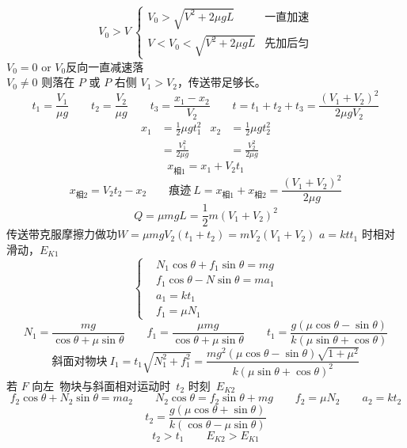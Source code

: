 \[
V_0>V\ \left\{\begin{array}{ll}
V_0>\sqrt{V^2+2\mu gL} & \text{一直加速}\\
V<V_0<\sqrt{V^2+2\mu gL} & \text{先加后匀}
\end{array}\right.
\]
$V_0=0$ or $V_0$反向\quad 一直减速落\\
$V_0\neq0$ 则\quad 落在 $P$ 或 $P$ 右侧
$V_1>V_2$，传送带足够长。
\[
t_1=\frac{V_1}{\mu g}\qquad t_2=\frac{V_2}{\mu g}\qquad t_3=\frac{x_1-x_2}{V_2}\qquad t=t_1+t_2+t_3=\frac{(V_1+V_2)^2}{2\mu gV_2}
\]
\[
\begin{aligned}
x_1&=\frac12\mu gt_1^2 & x_2&=\frac12\mu gt_2^2\\[2pt]
&=\frac{V_1^2}{2\mu g} & &=\frac{V_2^2}{2\mu g}
\end{aligned}
\]
\[
x_{\text{相}1}=x_1+V_2t_1
\]
\[
x_{\text{相}2}=V_2t_2-x_2\qquad \text{痕迹}\ L=x_{\text{相}1}+x_{\text{相}2}=\frac{(V_1+V_2)^2}{2\mu g}
\]
\[
Q=\mu mgL=\frac12m(V_1+V_2)^2
\]
传送带克服摩擦力做功\quad $W=\mu mgV_2(t_1+t_2)=mV_2(V_1+V_2)$
$a=kt$\quad $t_1$ 时相对滑动，$E_{K1}$
\[
\left\{\begin{aligned}
&N_1\cos\theta+f_1\sin\theta=mg\\
&f_1\cos\theta-N\sin\theta=ma_1 %
\\
&a_1=kt_1\\
&f_1=\mu N_1
\end{aligned}\right.
\]
\[
N_1=\frac{mg}{\cos\theta+\mu\sin\theta}\qquad f_1=\frac{\mu mg}{\cos\theta+\mu\sin\theta}\qquad t_1=\frac{g(\mu\cos\theta-\sin\theta)}{k(\mu\sin\theta+\cos\theta)}
\]
\[
\text{斜面对物块}\ I_1=t_1\sqrt{N_1^2+f_1^2}=\frac{mg^2(\mu\cos\theta-\sin\theta)\sqrt{1+\mu^2}}{k(\mu\sin\theta+\cos\theta)^2}
\]
若 $F$ 向左\ 物块与斜面相对运动时\ $t_2$ 时刻\ $E_{K2}$
\[
f_2\cos\theta+N_2\sin\theta=ma_2\qquad N_2\cos\theta=f_2\sin\theta+mg\qquad f_2=\mu N_2\qquad a_2=kt_2
\]
\[
t_2=\frac{g(\mu\cos\theta+\sin\theta)}{k(\cos\theta-\mu\sin\theta)}
\]
\[
t_2>t_1\qquad E_{K2}>E_{K1}
\]
